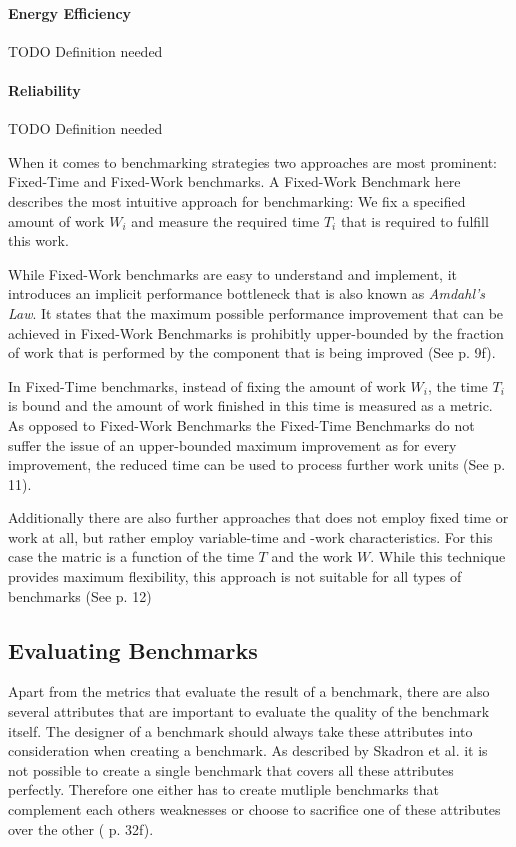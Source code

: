 \documentclass[	runningheads,
				a4paper]{llncs}
\begin{document}
\paragraph{Energy Efficiency} TODO Definition needed

\paragraph{Reliability} TODO Definition needed

When it comes to benchmarking strategies two approaches are most prominent: Fixed-Time and Fixed-Work benchmarks. A Fixed-Work Benchmark here describes the most intuitive approach for benchmarking: We fix a specified amount of work $W_i$ and measure the required time $T_i$ that is required to fulfill this work.

While Fixed-Work benchmarks are easy to understand and implement, it introduces an implicit performance bottleneck that is also known as \textit{Amdahl's Law}. It states that the maximum possible performance improvement that can be achieved in Fixed-Work Benchmarks is prohibitly upper-bounded by the fraction of work that is performed by the component that is being improved (See \cite{Kounev} p. 9f).

In Fixed-Time benchmarks, instead of fixing the amount of work $W_i$, the time $T_i$ is bound and the amount of work finished in this time is measured as a metric. As opposed to Fixed-Work Benchmarks the Fixed-Time Benchmarks do not suffer the issue of an upper-bounded maximum improvement as for every improvement, the reduced time can be used to process further work units (See \cite{Kounev} p. 11).

Additionally there are also further approaches that does not employ fixed time or work at all, but rather employ variable-time and -work characteristics. For this case the matric is a function of the time $T$ and the work $W$. While this technique provides maximum flexibility, this approach is not suitable for all types of benchmarks (See \cite{Kounev} p. 12)

\subsection{Evaluating Benchmarks}

Apart from the metrics that evaluate the result of a benchmark, there are also several attributes that are important to evaluate the quality of the benchmark itself. The designer of a benchmark should always take these attributes into consideration when creating a benchmark. As described by Skadron et al. it is not possible to create a single benchmark that covers all these attributes perfectly. Therefore one either has to create mutliple benchmarks that complement each others weaknesses or choose to sacrifice one of these attributes over the other (\cite{Skadron2003} p. 32f).
\end{document}
